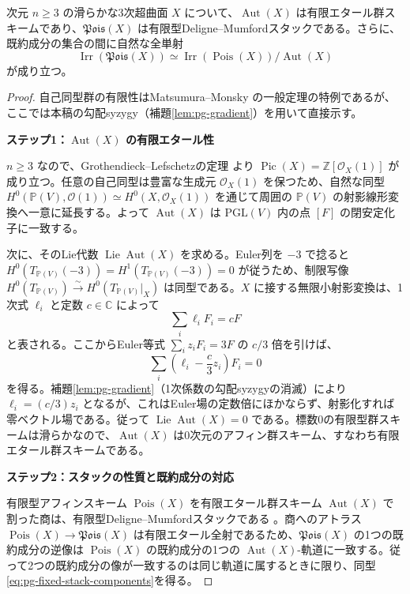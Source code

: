 \begin{proposition}\label{prop:pg-fixed-stack-algebraic}
次元 $n\ge3$ の滑らかな3次超曲面 $X$ について、$\operatorname{Aut}(X)$ は有限エタール群スキームであり、$\mathfrak{Pois}(X)$ は有限型Deligne--Mumfordスタックである。さらに、既約成分の集合の間に自然な全単射
\begin{equation}\label{eq:pg-fixed-stack-components}
\operatorname{Irr}(\mathfrak{Pois}(X))
\simeq\operatorname{Irr}(\operatorname{Pois}(X))/\operatorname{Aut}(X)
\end{equation}
が成り立つ。
\end{proposition}

\begin{proof}
自己同型群の有限性はMatsumura--Monsky \cite{PMatsumuraMonsky} の一般定理の特例であるが、ここでは本稿の勾配syzygy（補題\ref{lem:pg-gradient}）を用いて直接示す。

\par\medskip\noindent\textbf{ステップ1：$\operatorname{Aut}(X)$ の有限エタール性}\par\nobreak\smallskip
$n\ge3$ なので、Grothendieck--Lefschetzの定理 \cite{PGLefschetz} より $\operatorname{Pic}(X)=\mathbb Z[\mathcal O_X(1)]$ が成り立つ。任意の自己同型は豊富な生成元 $\mathcal O_X(1)$ を保つため、自然な同型 $H^0(\mathbb P(V),\mathcal O(1))\simeq H^0(X,\mathcal O_X(1))$ を通じて周囲の $\mathbb P(V)$ の射影線形変換へ一意に延長する。よって $\operatorname{Aut}(X)$ は $\mathrm{PGL}(V)$ 内の点 $[F]$ の閉安定化子に一致する。

次に、そのLie代数 $\operatorname{Lie}\operatorname{Aut}(X)$ を求める。Euler列を $-3$ で捻ると $H^0(T_{\mathbb P(V)}(-3))=H^1(T_{\mathbb P(V)}(-3))=0$ が従うため、制限写像 $H^0(T_{\mathbb P(V)})\xrightarrow{\sim} H^0(T_{\mathbb P(V)}|_X)$ は同型である。$X$ に接する無限小射影変換は、1次式 $\ell_i$ と定数 $c\in\mathbb C$ によって
\begin{equation}\label{eq:pg-stack-infinitesimal}
  \sum_i\ell_iF_i=cF
\end{equation}
と表される。ここからEuler等式 $\sum_i z_i F_i=3F$ の $c/3$ 倍を引けば、
\[
  \sum_i\left(\ell_i-\frac{c}{3}z_i\right)F_i=0
\]
を得る。補題\ref{lem:pg-gradient}（1次係数の勾配syzygyの消滅）により $\ell_i=(c/3)z_i$ となるが、これはEuler場の定数倍にほかならず、射影化すれば零ベクトル場である。従って $\operatorname{Lie}\operatorname{Aut}(X)=0$ である。標数0の有限型群スキームは滑らかなので、$\operatorname{Aut}(X)$ は0次元のアフィン群スキーム、すなわち有限エタール群スキームである。

\par\medskip\noindent\textbf{ステップ2：スタックの性質と既約成分の対応}\par\nobreak\smallskip
有限型アフィンスキーム $\operatorname{Pois}(X)$ を有限エタール群スキーム $\operatorname{Aut}(X)$ で割った商は、有限型Deligne--Mumfordスタックである \cite[Theorem~97.17.2, Tag~06FI]{PStacks}。商へのアトラス $\operatorname{Pois}(X)\to\mathfrak{Pois}(X)$ は有限エタール全射であるため、$\mathfrak{Pois}(X)$ の1つの既約成分の逆像は $\operatorname{Pois}(X)$ の既約成分の1つの $\operatorname{Aut}(X)$-軌道に一致する。従って2つの既約成分の像が一致するのは同じ軌道に属するときに限り、同型\eqref{eq:pg-fixed-stack-components}を得る。
\end{proof}

